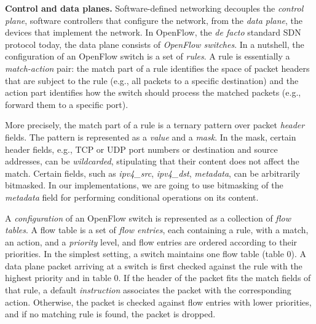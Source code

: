 \documentclass[conference]{sigcomm-alternate}
\newcommand{\liron}[1]{\textit{\textcolor{mygreen}{[liron]: #1}}} %
\begin{document}
\vspace{1mm}
\noindent\textbf{Control and data planes.} Software-defined networking
decouples the \emph{control plane}, software
controllers that configure the network, from the \emph{data plane}, the
devices that implement the network.
%
In OpenFlow, the \emph{de facto} standard SDN protocol
today, the data plane consists of \emph{OpenFlow switches}.
In a nutshell, the configuration of an OpenFlow switch is a set of
\emph{rules}.
A rule is essentially a \emph{match-action} pair:
the match part of a rule identifies the space of packet headers that are
subject to the rule (e.g., all packets to a specific destination) and
the action part identifies how the switch should process the matched
packets (e.g., forward them to a specific port).

More precisely, the match part of a rule is
a ternary pattern over packet \emph{header} fields.
The pattern is represented as a \emph{value} and a \emph{mask}. 
In the mask, certain header fields, e.g., TCP or UDP port numbers or destination and source
addresses, can be \emph{wildcarded}, stipulating that their content does
not affect the match.
Certain fields, such as \emph{ipv4\_src}, \emph{ipv4\_dst}, \emph{metadata}, can be arbitrarily
bitmasked.
In our implementations, we are going to use bitmasking of the \emph{metadata}
field for performing conditional operations on  its content.

A \emph{configuration} of an OpenFlow switch is represented as a
collection of \emph{flow tables}.
A flow table is a set of \emph{flow entries}, each containing a rule,
with a match, an action, and a \emph{priority} level, and flow entries
are ordered according to their priorities.
In the simplest setting, a switch maintains one flow table (table 0).
A data plane packet arriving at a switch is first checked against
the rule with the highest priority and in table $0$.
If the header of the packet fits the match fields of that rule,
a default \emph{instruction} associates the packet with the corresponding action.
Otherwise, the packet is checked against flow  entries with lower
priorities, and if no matching rule is found, the packet is dropped.
\end{document}
